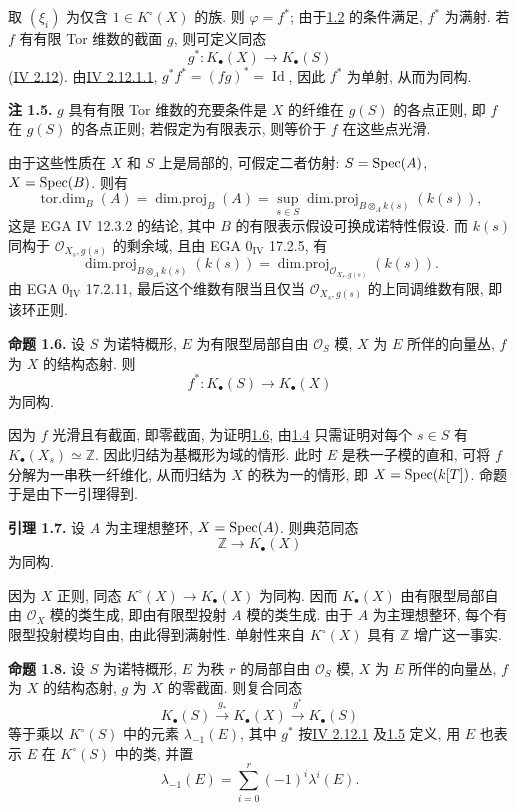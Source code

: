 取 $(\xi_i)$ 为仅含 $1\in K^\circ(X)$ 的族. 则 $\varphi=f^*$; 由于\hyperlink{sga6.e09.prop.1-2}{1.2} 的条件满足, $f^*$ 为满射. 若 $f$ 有有限 Tor 维数的截面 $g$, 则可定义同态
\[
 g^*:K_\bullet(X)\longrightarrow K_\bullet(S)
\]
(\hyperlink{sga6.e04.para.2-12}{IV 2.12}). 由\hyperlink{sga6.e04.eq.2-12-1-1}{IV 2.12.1.1}, $g^*f^*=(fg)^*=\operatorname{Id}$, 因此 $f^*$ 为单射, 从而为同构.

\textbf{注 1.5.} $g$ 具有有限 Tor 维数的充要条件是 $X$ 的纤维在 $g(S)$ 的各点正则, 即 $f$ 在 $g(S)$ 的各点正则; 若假定为有限表示, 则等价于 $f$ 在这些点光滑.

由于这些性质在 $X$ 和 $S$ 上是局部的, 可假定二者仿射: $S=\operatorname{Spec}(A)$, $X=\operatorname{Spec}(B)$. 则有
\[
 \operatorname{tor.dim}_B(A)=\operatorname{dim.proj}_B(A)=\sup_{s\in S}\operatorname{dim.proj}_{B\otimes_A k(s)}(k(s)),
\]
这是 EGA IV 12.3.2 的结论, 其中 $B$ 的有限表示假设可换成诺特性假设. 而 $k(s)$ 同构于 $\mathcal O_{X_s,g(s)}$ 的剩余域, 且由 EGA $0_{\mathrm{IV}}$ 17.2.5, 有
\[
 \operatorname{dim.proj}_{B\otimes_A k(s)}(k(s))=
 \operatorname{dim.proj}_{\mathcal O_{X_s,g(s)}}(k(s)).
\]
由 EGA $0_{\mathrm{IV}}$ 17.2.11, 最后这个维数有限当且仅当 $\mathcal O_{X_s,g(s)}$ 的上同调维数有限, 即该环正则.

\textbf{命题 1.6.} 设 $S$ 为诺特概形, $E$ 为有限型局部自由 $\mathcal O_S$ 模, $X$ 为 $E$ 所伴的向量丛, $f$ 为 $X$ 的结构态射. 则
\[
 f^*:K_\bullet(S)\longrightarrow K_\bullet(X)
\]
为同构.

因为 $f$ 光滑且有截面, 即零截面, 为证明\hyperlink{sga6.e09.prop.1-6}{1.6}, 由\hyperlink{sga6.e09.cor.1-4}{1.4} 只需证明对每个 $s\in S$ 有 $K_\bullet(X_s)\simeq \mathbb Z$. 因此归结为基概形为域的情形. 此时 $E$ 是秩一子模的直和, 可将 $f$ 分解为一串秩一纤维化, 从而归结为 $X$ 的秩为一的情形, 即 $X=\operatorname{Spec}(k[T])$. 命题于是由下一引理得到.

\textbf{引理 1.7.} 设 $A$ 为主理想整环, $X=\operatorname{Spec}(A)$. 则典范同态
\[
 \mathbb Z\longrightarrow K_\bullet(X)
\]
为同构.

因为 $X$ 正则, 同态 $K^\circ(X)\to K_\bullet(X)$ 为同构. 因而 $K_\bullet(X)$ 由有限型局部自由 $\mathcal O_X$ 模的类生成, 即由有限型投射 $A$ 模的类生成. 由于 $A$ 为主理想整环, 每个有限型投射模均自由, 由此得到满射性. 单射性来自 $K^\circ(X)$ 具有 $\mathbb Z$ 增广这一事实.

\textbf{命题 1.8.} 设 $S$ 为诺特概形, $E$ 为秩 $r$ 的局部自由 $\mathcal O_S$ 模, $X$ 为 $E$ 所伴的向量丛, $f$ 为 $X$ 的结构态射, $g$ 为 $X$ 的零截面. 则复合同态
\[
 K_\bullet(S)\xrightarrow{g_*}K_\bullet(X)\xrightarrow{g^*}K_\bullet(S)
\]
等于乘以 $K^\circ(S)$ 中的元素 $\lambda_{-1}(E)$, 其中 $g^*$ 按\hyperlink{sga6.e04.eq.2-12-1}{IV 2.12.1} 及\hyperlink{sga6.e09.rem.1-5}{1.5} 定义, 用 $E$ 也表示 $E$ 在 $K^\circ(S)$ 中的类, 并置
\[
 \lambda_{-1}(E)=\sum_{i=0}^r(-1)^i\lambda^i(E).
\]

